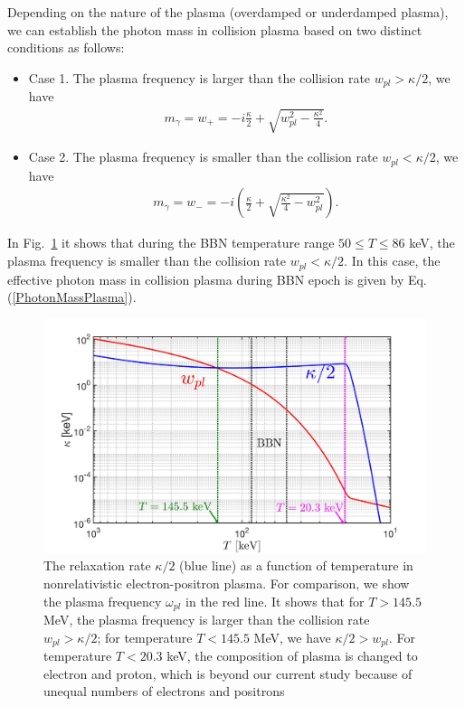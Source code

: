 Depending on the nature of the plasma (overdamped or underdamped plasma), we can establish the photon mass in collision plasma based on two distinct conditions as follows:
\begin{itemize}
\item Case 1. The plasma frequency is larger than the collision rate $w_{pl}>\kappa/2$, we have
\begin{align}
m_\gamma=w_+=-i\frac{\kappa}{2}+\sqrt{w^2_{pl}-\frac{\kappa^2}{4}}.
\end{align}
\item Case 2. The plasma frequency is smaller than the collision rate $w_{pl}<\kappa/2$, we have
\begin{align}\label{PhotonMassPlasma}
m_\gamma=w_-=-i\left(\frac{\kappa}{2}+\sqrt{\frac{\kappa^2}{4}-w^2_{pl}}\right).
\end{align}
\end{itemize}
In Fig.~\ref{RelaxationRate002_fig} it shows that during the BBN temperature range $50\leqslant T\leqslant 86$ keV, the plasma frequency is smaller than the collision rate $w_{pl}<\kappa/2$.  In this case, the effective photon mass in collision plasma during BBN epoch is given by Eq.(\ref{PhotonMassPlasma}).

\begin{figure}  
\centerline{\includegraphics[width=\linewidth]{./plots/KappaElectronPhotonMass_Talk}}
\caption{The relaxation rate $\kappa/2$ (blue line) as a function of temperature in nonrelativistic electron-positron plasma. For comparison, we show the plasma frequency $\omega_{pl}$ in the red line. It shows that for $T>145.5$ MeV, the plasma frequency is larger than the collision rate $w_{pl}>\kappa/2$; for temperature $T<145.5$ MeV, we have $\kappa/2>w_{pl}$. For temperature $T<20.3$ keV, the composition of plasma is changed to electron and proton, which is beyond our current study because of unequal numbers of electrons and positrons}
\label{RelaxationRate002_fig} 
\end{figure}

